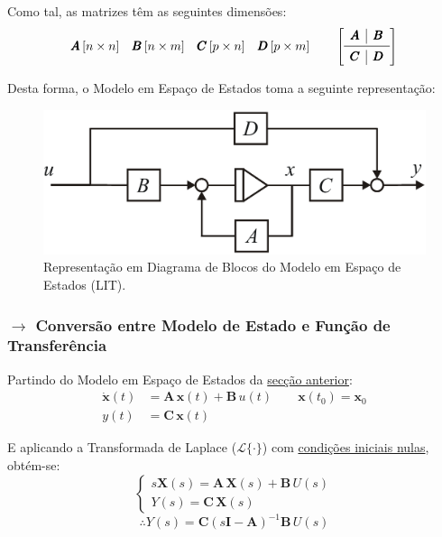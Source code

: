 \noindent Como tal, as matrizes têm as seguintes dimensões:
$$
    \pmb{A}\, [n\times n]\quad \pmb{B}\, [n\times m]\quad \pmb{C}\, [p\times n]\quad \pmb{D}\, [p\times m]\qquad\left[ \begin{array}{c|c} \pmb{A} & \pmb{B} \\ \midrule \pmb{C} & \pmb{D} \\ \end{array}\right]
$$

\noindent Desta forma, o Modelo em Espaço de Estados toma a seguinte representação:
\begin{figure}[H]
    \centering
    \includegraphics[width = 0.85\linewidth]{img/state-space-models/LTI-state-space-model.png}
    \caption{Representação em Diagrama de Blocos do Modelo em Espaço de Estados (LIT).}
    \label{fig:LTI-state-space-model}
\end{figure}

\newpage
\subsubsection[1.1.1 Conversão entre Modelo de Estado e Função de Transferência]{$\pmb{\rightarrow}$ Conversão entre Modelo de Estado e Função de Transferência}
\label{subsec:convertion-to-transfer}

\noindent Partindo do Modelo em Espaço de Estados da \hyperref[subsec:state-space-model]{secção anterior}\footnotemark[1]:
\begin{align*}
    \dot{\pmb{x}}(t) &= \pmb{A}\, \pmb{x}(t) + \pmb{B}\, u(t)\qquad \pmb{x}(t_0) = \pmb{x}_0 \\
    y(t) &= \pmb{C}\, \pmb{x}(t)
\end{align*}

\noindent E aplicando a Transformada de Laplace ($\mathcal{L}\{\cdot\}$) com \underline{condições iniciais nulas}, obtém-se:
$$
    \begin{cases}
        s\pmb{X}(s) = \pmb{A}\,\pmb{X}(s) + \pmb{B}\,U(s) \\
        Y(s) = \pmb{C}\, \pmb{X}(s)
    \end{cases}
$$
$$
    \therefore Y(s) = \pmb{C}\left( s\pmb{I}-\pmb{A} \right)^{-1}\pmb{B}\,U(s)
$$

